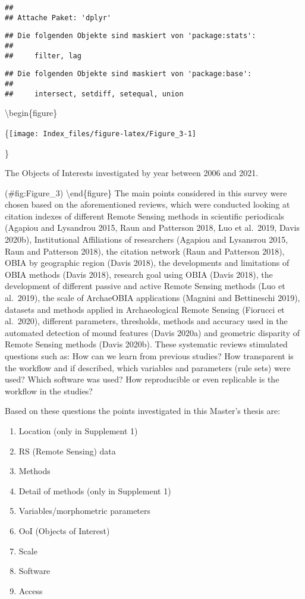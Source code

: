 \documentclass[
]{article}
\providecommand{\tightlist}{%
  \setlength{\itemsep}{0pt}\setlength{\parskip}{0pt}}
\begin{document}
\begin{verbatim}
## 
## Attache Paket: 'dplyr'
\end{verbatim}

\begin{verbatim}
## Die folgenden Objekte sind maskiert von 'package:stats':
## 
##     filter, lag
\end{verbatim}

\begin{verbatim}
## Die folgenden Objekte sind maskiert von 'package:base':
## 
##     intersect, setdiff, setequal, union
\end{verbatim}

\textbackslash begin\{figure\}

\{\centering \texttt{[image: Index\_files/figure-latex/Figure\_3-1]}

\}

\caption{The Objects of Interests investigated by year between 2006 and 2021.}

(\#fig:Figure\_3)
\textbackslash end\{figure\}
The main points considered in this survey were chosen based on the aforementioned reviews, which were conducted looking at citation indexes of different Remote Sensing methods in scientific periodicals (Agapiou and Lysandrou 2015, Raun and Patterson 2018, Luo et al.~2019, Davis 2020b), Institutional Affiliations of researchers (Agapiou and Lysansrou 2015, Raun and Patterson 2018), the citation network (Raun and Patterson 2018), OBIA by geographic region (Davis 2018), the developments and limitations of OBIA methods (Davis 2018), research goal using OBIA (Davis 2018), the development of different passive and active Remote Sensing methods (Luo et al.~2019), the scale of ArchaeOBIA applications (Magnini and Bettineschi 2019), datasets and methods applied in Archaeological Remote Sensing (Fiorucci et al.~2020), different parameters, thresholds, methods and accuracy used in the automated detection of mound features (Davis 2020a) and geometric disparity of Remote Sensing methods (Davis 2020b).
These systematic reviews stimulated questions such as: How can we learn from previous studies? How transparent is the workflow and if described, which variables and parameters (rule sets) were used? Which software was used? How reproducible or even replicable is the workflow in the studies?

Based on these questions the points investigated in this Master's thesis are:

\begin{enumerate}
\def\labelenumi{(\roman{enumi})}
\tightlist
\item
  Location (only in Supplement 1)
\item
  RS (Remote Sensing) data
\item
  Methods
\item
  Detail of methods (only in Supplement 1)
\item
  Variables/morphometric parameters
\item
  OoI (Objects of Interest)
\item
  Scale
\item
  Software
\item
  Access
\end{enumerate}
\end{document}
